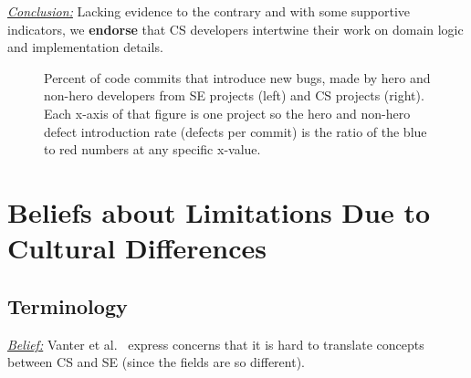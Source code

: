 \documentclass[sigconf,review,anonymous]{acmart}
\newenvironment{RQ}{\vspace{1mm}\begin{tcolorbox}[enhanced,width=3.4in,size=fbox,colback=red!5!white,drop shadow southeast,sharp corners]}{\end{tcolorbox}}
\begin{document}
\begin{RQ}
\textit{\underline{Conclusion:}} Lacking evidence to the contrary and with some supportive indicators, 
we \textbf{endorse}  that CS developers intertwine their work
on domain logic and implementation details.
\end{RQ}




\begin{figure}[!b]

\caption{Percent of code commits that introduce new bugs, made by hero and non-hero developers from  SE projects (left) and CS projects (right).
Each x-axis of that figure is one project so the hero and non-hero defect introduction rate (defects per commit) is the ratio of the blue to red numbers
at any specific x-value.
}\label{fig:heroes}
\end{figure}

\section{Beliefs about Limitations Due to Cultural Differences}

\subsection{Terminology}\label{terms}
\noindent \textit{\underline{Belief:}} 
Vanter et al.~\cite{faulk09_secs, easterbrook_cs, boyle09_lessons} express concerns
that it is hard to translate concepts between  CS and SE (since the fields are so different). 
\end{document}
